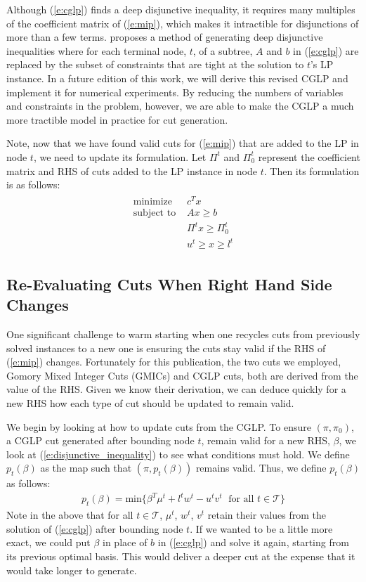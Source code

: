 \documentclass[10pt]{article}
\begin{document}
	Although (\ref{e:cglp}) finds a deep disjunctive inequality, it requires many multiples of the coefficient matrix of (\ref{e:mip}), which makes it intractible for disjunctions of more than a few terms. \cite{aleks} proposes a method of generating deep disjunctive inequalities where for each terminal node, $ t $, of a subtree, $ A $ and $ b $ in (\ref{e:cglp}) are replaced by the subset of constraints that are tight at the solution to $ t $'s LP instance. In a future edition of this work, we will derive this revised CGLP and implement it for numerical experiments. By reducing the numbers of variables and constraints in the problem, however, we are able to make the CGLP a much more tractible model in practice for cut generation.	
	
	Note, now that we have found valid cuts for (\ref{e:mip}) that are added to the LP in node $ t $, we need to update its formulation. Let $ \Pi^t $ and $ \Pi_0^t $ represent the coefficient matrix and RHS of cuts added to the LP instance in node $ t $. Then its formulation is as follows:
	\begin{align}
		\begin{split}
			\text{minimize } & c^T x \\
			\text{subject to } & Ax \geq b \\
			& \Pi^t x \geq \Pi_0^t \\
			& u^t \geq x \geq l^t
		\end{split} \label{e:lp_cut}
	\end{align}
	
	\subsection{Re-Evaluating Cuts When Right Hand Side Changes} \label{ss:rhs}
	One significant challenge to warm starting when one recycles cuts from previously solved instances to a new one is ensuring the cuts stay valid if the RHS of (\ref{e:mip}) changes. Fortunately for this publication, the two cuts we employed, Gomory Mixed Integer Cuts (GMICs) and CGLP cuts, both are derived from the value of the RHS. Given we know their derivation, we can deduce quickly for a new RHS how each type of cut should be updated to remain valid.
	
	We begin by looking at how to update cuts from the CGLP. To ensure $ (\pi, \pi_0) $, a CGLP cut generated after bounding node $ t $, remain valid for a new RHS, $ \beta $, we look at (\ref{e:disjunctive_inequality}) to see what conditions must hold. We define $ p_t(\beta) $ as the map such that $ (\pi, p_t(\beta)) $ remains valid. Thus, we define $ p_t(\beta) $ as follows:
	\begin{align}
		p_t(\beta) = \text{min} \{\beta^T \mu^t + l^t w^t - u^t v^t \; \text{ for all } t \in \mathcal{T}\} \label{e:updated_cglp_approx}
	\end{align}
	Note in the above that for all $ t \in \mathcal{T} $, $ \mu^t $, $ w^t $, $ v^t $ retain their values from the solution of (\ref{e:cglp}) after bounding node $ t $. If we wanted to be a little more exact, we could put $ \beta $ in place of $ b $ in (\ref{e:cglp}) and solve it again, starting from its previous optimal basis. This would deliver a deeper cut at the expense that it would take longer to generate.
	
\end{document}
